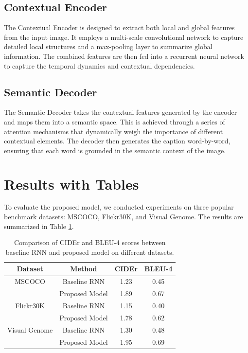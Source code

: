 \documentclass[12pt]{article}
\begin{document}
\subsection{Contextual Encoder}
The Contextual Encoder is designed to extract both local and global features from the input image. It employs a multi-scale convolutional network to capture detailed local structures and a max-pooling layer to summarize global information. The combined features are then fed into a recurrent neural network to capture the temporal dynamics and contextual dependencies.

\subsection{Semantic Decoder}
The Semantic Decoder takes the contextual features generated by the encoder and maps them into a semantic space. This is achieved through a series of attention mechanisms that dynamically weigh the importance of different contextual elements. The decoder then generates the caption word-by-word, ensuring that each word is grounded in the semantic context of the image.

\section{Results with Tables}
To evaluate the proposed model, we conducted experiments on three popular benchmark datasets: MSCOCO, Flickr30K, and Visual Genome. The results are summarized in Table \ref{table:results}.

\begin{table}[ht]
\centering
\begin{tabular}{|c|c|c|c|}
\hline
\textbf{Dataset} & \textbf{Method} & \textbf{CIDEr} & \textbf{BLEU-4} \\
\hline
MSCOCO & Baseline RNN & 1.23 & 0.45 \\
& Proposed Model & 1.89 & 0.67 \\
\hline
Flickr30K & Baseline RNN & 1.15 & 0.40 \\
& Proposed Model & 1.78 & 0.62 \\
\hline
Visual Genome & Baseline RNN & 1.30 & 0.48 \\
& Proposed Model & 1.95 & 0.69 \\
\hline
\end{tabular}
\caption{Comparison of CIDEr and BLEU-4 scores between baseline RNN and proposed model on different datasets.}
\label{table:results}
\end{table}
\end{document}
